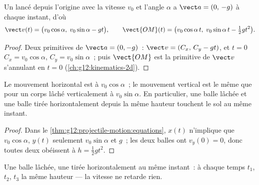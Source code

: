 \begin{theorem}\label{thm:g12:projectile-motion:equations}
Un  lancé depuis l'origine avec la vitesse
$v_0$ et l'angle $\alpha$ a $\vect a = (0,\,-g)$ à chaque instant, d'où
\[
\vect v(t) = \bigl(v_0\cos\alpha,\; v_0\sin\alpha - g t\bigr),
\qquad
\vect{OM}(t) = \bigl(v_0\cos\alpha\, t,\; v_0\sin\alpha\, t - \tfrac12 g t^2\bigr).
\]
\end{theorem}

\begin{proof}
Deux primitives de $\vect a = (0,-g)$~: $\vect v = (C_x,\, C_y - gt)$,
et $t = 0$  $C_x = v_0\cos\alpha$, $C_y = v_0\sin\alpha$~; puis
$\vect{OM}$ est la primitive de $\vect v$ s'annulant en $t = 0$
(\cref{ch:g12:kinematics-2d}).
\end{proof}

\begin{proposition}\label{prop:g12:projectile-motion:independence}
Le mouvement horizontal est  à
$v_0\cos\alpha$~; le mouvement vertical est le même que pour un corps
lâché verticalement à $v_0\sin\alpha$. En particulier, une balle
lâchée et une balle tirée horizontalement depuis la même hauteur
touchent le sol au même instant.
\end{proposition}

\begin{proof}
Dans le \cref{thm:g12:projectile-motion:equations}, $x(t)$ n'implique
que $v_0\cos\alpha$, $y(t)$ seulement $v_0\sin\alpha$ et $g$~; les
deux balles ont $v_y(0) = 0$, donc toutes deux obéissent à
$h = \tfrac12 gt^2$.
\end{proof}

\begin{omfigure}

{\small Une balle lâchée, une tirée horizontalement au même instant~: à
chaque temps $t_1$, $t_2$, $t_3$ la même hauteur --- la vitesse ne retarde rien.}
\end{omfigure}

